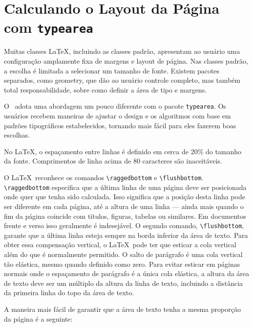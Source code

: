 \chapter{Calculando o Layout da Página com \texttt{typearea}}
Muitas classes \LaTeX, incluindo as classes padrão, apresentam ao usuário uma configuração amplamente fixa de margens e layout de página. Nas classes padrão, a escolha é limitada a selecionar um tamanho de fonte. Existem pacotes separados, como geometry, que dão ao usuário controle completo, mas também total responsabilidade, sobre como definir a área de tipo e margens.

O \KOMAScript\ adota uma abordagem um pouco diferente com o pacote \texttt{typearea}. Os usuários recebem maneiras de ajustar o design e os algoritmos com base em padrões tipográficos estabelecidos, tornando mais fácil para eles fazerem boas escolhas.

No LaTeX, o espaçamento entre linhas é definido em cerca de 20\% do tamanho da fonte.
Comprimentos de linha acima de 80 caracteres são inaceitáveis.

O \LaTeX\ reconhece os comandos \verb|\raggedbottom| e \verb|\flushbottom|. \verb|\raggedbottom| especifica que a última linha de uma página deve ser posicionada onde quer que tenha sido calculada. Isso significa que a posição desta linha pode ser diferente em cada página, até a altura de uma linha — ainda mais quando o fim da página coincide com títulos, figuras, tabelas ou similares. Em documentos frente e verso isso geralmente é indesejável. O segundo comando, \verb|\flushbottom|, garante que a última linha esteja sempre na borda inferior da área de texto. Para obter essa compensação vertical, o  \LaTeX\ pode ter que esticar a cola vertical além do que é normalmente permitido. O salto de parágrafo é uma cola vertical tão elástica, mesmo quando definido como zero. Para evitar esticar em páginas normais onde o espaçamento de parágrafo é a única cola elástica, a altura da área de texto deve ser um múltiplo da altura da linha de texto, incluindo a distância da primeira linha do topo da área de texto.

A maneira mais fácil de garantir que a área de texto tenha a mesma proporção da página é a seguinte:


